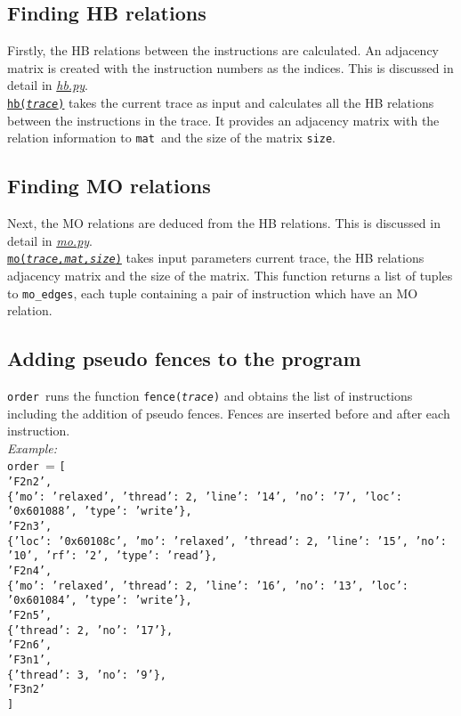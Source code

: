 \documentclass{article}
\newcommand{\var}[1]{\color{OliveGreen} \texttt{#1}\color{black}}
\newcommand{\fun}[2]{\color{Sepia}\texttt{#1(\color{Gray}\textit{#2}\color{Sepia})}\color{black}}
\newcommand{\varinfo}[1]{\scriptsize \texttt{#1} \normalsize}
\begin{document}
\subsection{Finding HB relations}
Firstly, the HB relations between the instructions are calculated. An adjacency matrix is created with the instruction numbers as the indices. This is discussed in detail in \href{hb.tex}{\textit{hb.py}}.\\
\href{hb.tex}{\fun{hb}{trace}} takes the current trace as input and calculates all the HB relations between the instructions in the trace. It provides an adjacency matrix with the relation information to \var{mat }and the size of the matrix \var{size}.

\subsection{Finding MO relations}
Next, the MO relations are deduced from the HB relations. This is discussed in detail in \href{mo.tex}{\textit{mo.py}}.\\
\href{mo.tex}{\fun{mo}{trace,mat,size}} takes input parameters current trace, the HB relations adjacency matrix and the size of the matrix. This function returns a list of tuples to \var{mo\_edges}, each tuple containing a pair of instruction which have an MO relation.

\subsection{Adding pseudo fences to the program}
\var{order }runs the function \fun{fence}{trace} and obtains the list of instructions including the addition of pseudo fences. Fences are inserted before and after each instruction.\\
\textit{Example:}\\
\var{order }= \varinfo{[\\
'F2n2', \\
\{'mo': 'relaxed', 'thread': 2, 'line': '14', 'no': '7', 'loc': '0x601088', 'type': 'write'\},\\ 
'F2n3', \\
\{'loc': '0x60108c', 'mo': 'relaxed', 'thread': 2, 'line': '15', 'no': '10', 'rf': '2', 'type': 'read'\}, \\
'F2n4', \\
\{'mo': 'relaxed', 'thread': 2, 'line': '16', 'no': '13', 'loc': '0x601084', 'type': 'write'\}, \\
'F2n5', \\
\{'thread': 2, 'no': '17'\}, \\
'F2n6', \\
'F3n1', \\
\{'thread': 3, 'no': '9'\}, \\
'F3n2'\\
]}
\end{document}
